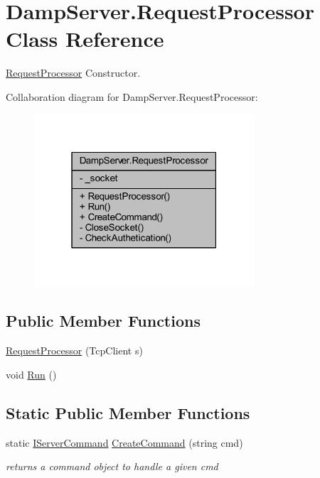 \hypertarget{class_damp_server_1_1_request_processor}{\section{Damp\-Server.\-Request\-Processor Class Reference}
\label{class_damp_server_1_1_request_processor}
}


\hyperlink{class_damp_server_1_1_request_processor}{Request\-Processor} Constructor.  




Collaboration diagram for Damp\-Server.\-Request\-Processor\-:
\nopagebreak
\begin{figure}[H]
\begin{center}
\leavevmode
\includegraphics[width=232pt]{class_damp_server_1_1_request_processor__coll__graph}
\end{center}
\end{figure}
\subsection*{Public Member Functions}
\begin{DoxyCompactItemize}
\item 
\hyperlink{class_damp_server_1_1_request_processor_a69b4b60f9bcc732b6be03e414881205c}{Request\-Processor} (Tcp\-Client s)
\item 
void \hyperlink{class_damp_server_1_1_request_processor_a7fa267e28e203f64b1b54c68e5d8fa48}{Run} ()
\end{DoxyCompactItemize}
\subsection*{Static Public Member Functions}
\begin{DoxyCompactItemize}
\item 
static \hyperlink{interface_damp_server_1_1_i_server_command}{I\-Server\-Command} \hyperlink{class_damp_server_1_1_request_processor_ab01e203c3aa7503de67a8e7b4e95d189}{Create\-Command} (string cmd)
\begin{DoxyCompactList}\small\item\em returns a command object to handle a given cmd \end{DoxyCompactList}\end{DoxyCompactItemize}
